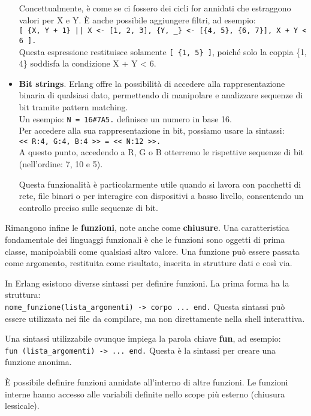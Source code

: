 \documentclass{article}
\begin{document}
\begin{itemize}
    Concettualmente, è come se ci fossero dei cicli for annidati che estraggono valori per X e Y. È anche possibile aggiungere filtri, ad esempio:\\
    \texttt{[ \{X, Y + 1\} || X <- [1, 2, 3], \{Y, \_\} <- [\{4, 5\}, \{6, 7\}], X + Y < 6 ].}\\
    Questa espressione restituisce solamente \texttt{[ \{1, 5\} ]}, poiché solo la coppia \{1, 4\} soddisfa la condizione X + Y < 6.
    \item \textbf{Bit strings}. Erlang offre la possibilità di accedere alla rappresentazione binaria di qualsiasi dato, permettendo di manipolare e analizzare sequenze di bit tramite pattern matching.\\
    Un esempio: \texttt{N = 16\#7A5.} definisce un numero in base 16.\\
    Per accedere alla sua rappresentazione in bit, possiamo usare la sintassi:\\
    \texttt{<< R:4, G:4, B:4 >> = << N:12 >>.}\\
    A questo punto, accedendo a R, G o B otterremo le rispettive sequenze di bit (nell'ordine: 7, 10 e 5).

    Questa funzionalità è particolarmente utile quando si lavora con pacchetti di rete, file binari o per interagire con dispositivi a basso livello, consentendo un controllo preciso sulle sequenze di bit.
\end{itemize}

Rimangono infine le \textbf{funzioni}, note anche come \textbf{chiusure}. Una caratteristica fondamentale dei linguaggi funzionali è che le funzioni sono oggetti di prima classe, manipolabili come qualsiasi altro valore. Una funzione può essere passata come argomento, restituita come risultato, inserita in strutture dati e così via.

In Erlang esistono diverse sintassi per definire funzioni. La prima forma ha la struttura:\\
\texttt{nome\_funzione(lista\_argomenti) -> corpo ... end.} Questa sintassi può essere utilizzata nei file da compilare, ma non direttamente nella shell interattiva.

Una sintassi utilizzabile ovunque impiega la parola chiave \textbf{fun}, ad esempio:\\
\texttt{fun (lista\_argomenti) -> ... end.} Questa è la sintassi per creare una funzione anonima.

È possibile definire funzioni annidate all'interno di altre funzioni. Le funzioni interne hanno accesso alle variabili definite nello scope più esterno (chiusura lessicale).
\end{document}
